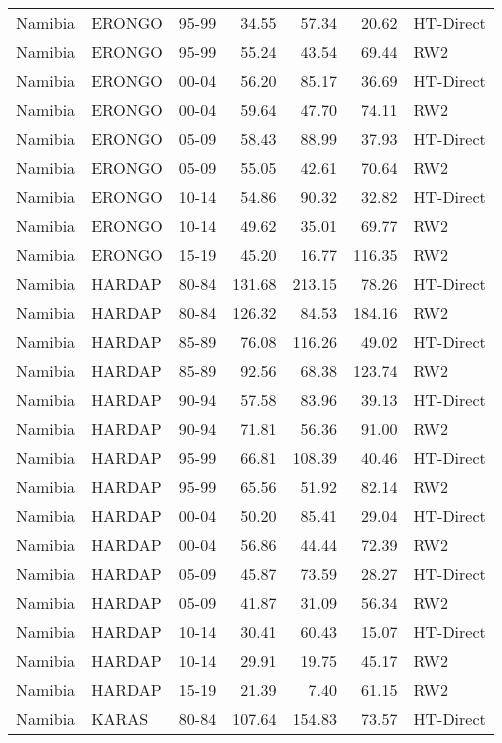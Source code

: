 \begin{longtable}{lllrrrl}
  Namibia & ERONGO & 95-99 & 34.55 & 57.34 & 20.62 & HT-Direct \\ 
  Namibia & ERONGO & 95-99 & 55.24 & 43.54 & 69.44 & RW2 \\ 
  Namibia & ERONGO & 00-04 & 56.20 & 85.17 & 36.69 & HT-Direct \\ 
  Namibia & ERONGO & 00-04 & 59.64 & 47.70 & 74.11 & RW2 \\ 
  Namibia & ERONGO & 05-09 & 58.43 & 88.99 & 37.93 & HT-Direct \\ 
  Namibia & ERONGO & 05-09 & 55.05 & 42.61 & 70.64 & RW2 \\ 
  Namibia & ERONGO & 10-14 & 54.86 & 90.32 & 32.82 & HT-Direct \\ 
  Namibia & ERONGO & 10-14 & 49.62 & 35.01 & 69.77 & RW2 \\ 
  Namibia & ERONGO & 15-19 & 45.20 & 16.77 & 116.35 & RW2 \\ 
  Namibia & HARDAP & 80-84 & 131.68 & 213.15 & 78.26 & HT-Direct \\ 
  Namibia & HARDAP & 80-84 & 126.32 & 84.53 & 184.16 & RW2 \\ 
  Namibia & HARDAP & 85-89 & 76.08 & 116.26 & 49.02 & HT-Direct \\ 
  Namibia & HARDAP & 85-89 & 92.56 & 68.38 & 123.74 & RW2 \\ 
  Namibia & HARDAP & 90-94 & 57.58 & 83.96 & 39.13 & HT-Direct \\ 
  Namibia & HARDAP & 90-94 & 71.81 & 56.36 & 91.00 & RW2 \\ 
  Namibia & HARDAP & 95-99 & 66.81 & 108.39 & 40.46 & HT-Direct \\ 
  Namibia & HARDAP & 95-99 & 65.56 & 51.92 & 82.14 & RW2 \\ 
  Namibia & HARDAP & 00-04 & 50.20 & 85.41 & 29.04 & HT-Direct \\ 
  Namibia & HARDAP & 00-04 & 56.86 & 44.44 & 72.39 & RW2 \\ 
  Namibia & HARDAP & 05-09 & 45.87 & 73.59 & 28.27 & HT-Direct \\ 
  Namibia & HARDAP & 05-09 & 41.87 & 31.09 & 56.34 & RW2 \\ 
  Namibia & HARDAP & 10-14 & 30.41 & 60.43 & 15.07 & HT-Direct \\ 
  Namibia & HARDAP & 10-14 & 29.91 & 19.75 & 45.17 & RW2 \\ 
  Namibia & HARDAP & 15-19 & 21.39 & 7.40 & 61.15 & RW2 \\ 
  Namibia & KARAS & 80-84 & 107.64 & 154.83 & 73.57 & HT-Direct \\ 

\end{longtable}
